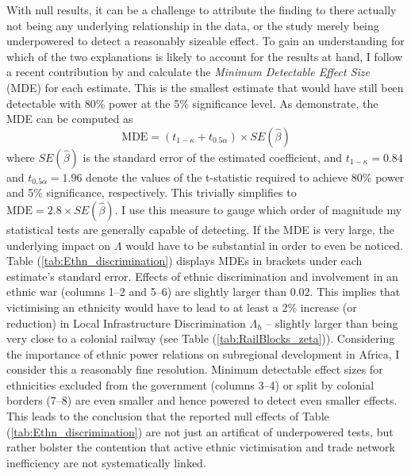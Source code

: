 \documentclass[11pt, oneside]{article}   	%
\let\oldref\ref
\renewcommand{\ref}[1]{(\oldref{#1})}
\begin{document}
With null results, it can be a challenge to attribute the finding to there actually not being any underlying relationship in the data, or the study merely being underpowered to detect a reasonably sizeable effect. To gain an understanding for which of the two explanations is likely to account for the results at hand, I follow a recent contribution by \cite{Haushofer_ShorttermImpactUnconditional_2016} and calculate the \emph{Minimum Detectable Effect Size} (MDE) for each estimate. This is the smallest estimate that would have still been detectable with 80\% power at the 5\% significance level. As \cite{Haushofer_ShorttermImpactUnconditional_2016} demonstrate, the MDE can be computed as
\begin{equation*}
  \textrm{MDE} = (t_{1-\kappa}+t_{0.5\alpha}) \times SE(\hat{\beta})
\end{equation*}
where $SE(\hat{\beta})$ is the standard error of the estimated coefficient, and $t_{1-\kappa}=0.84$ and $t_{0.5\alpha}=1.96$ denote the values of the t-statistic required to achieve 80\% power and 5\% significance, respectively. This trivially simplifies to $\textrm{MDE} = 2.8 \times SE(\hat{\beta})$. I use this measure to gauge which order of magnitude my statistical tests are generally capable of detecting. If the MDE is very large, the underlying impact on $\Lambda$ would have to be substantial in order to even be noticed. Table \ref{tab:Ethn_discrimination} displays MDEs in brackets under each estimate's standard error. Effects of ethnic discrimination and involvement in an ethnic war (columns 1--2 and 5--6) are slightly larger than $0.02$. This implies that victimising an ethnicity would have to lead to at least a 2\% increase (or reduction) in Local Infrastructure Discrimination $\Lambda_{h}$ -- slightly larger than being very close to a colonial railway (see Table \ref{tab:RailBlocks_zeta}). Considering the importance of ethnic power relations on subregional development in Africa, I consider this a reasonably fine resolution. Minimum detectable effect sizes for ethnicities excluded from the government (columns 3--4) or split by colonial borders (7--8) are even smaller and hence powered to detect even smaller effects. This leads to the conclusion that the reported null effects of Table \ref{tab:Ethn_discrimination} are not just an artificat of underpowered tests, but rather bolster the contention that active ethnic victimisation and trade network inefficiency are not systematically linked.
\end{document}
